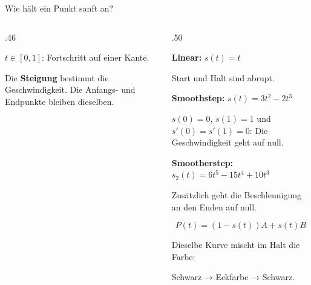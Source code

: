 \begin{frame}[label=demo4]{Wie hält ein Punkt sanft an?}
\small
{}
\begin{columns}[T,onlytextwidth]
\begin{column}{.46\textwidth}
\par
{\small $t\in[0,1]$: Fortschritt auf einer Kante.\par
Die \textbf{Steigung} bestimmt die Geschwindigkeit. Die Anfangs- und Endpunkte bleiben dieselben.}
\end{column}
\begin{column}{.50\textwidth}
{\small
\textcolor{muted}{\textbf{Linear:}} $s(t)=t$\par
Start und Halt sind abrupt.\par\medskip
\textcolor{sea}{\textbf{Smoothstep:}} $s(t)=3t^2-2t^3$\par
$s(0)=0$, $s(1)=1$ und $s'(0)=s'(1)=0$: Die Geschwindigkeit geht auf null.\par\medskip
\textcolor{accent}{\textbf{Smootherstep:}} $s_2(t)=6t^5-15t^4+10t^3$\par
Zusätzlich geht die Beschleunigung an den Enden auf null.}
\[P(t)=(1-s(t))A+s(t)B\]
{\small Dieselbe Kurve mischt im Halt die Farbe:\par Schwarz → Eckfarbe → Schwarz.\par\smallskip
}
\end{column}
\end{columns}
\end{frame}

